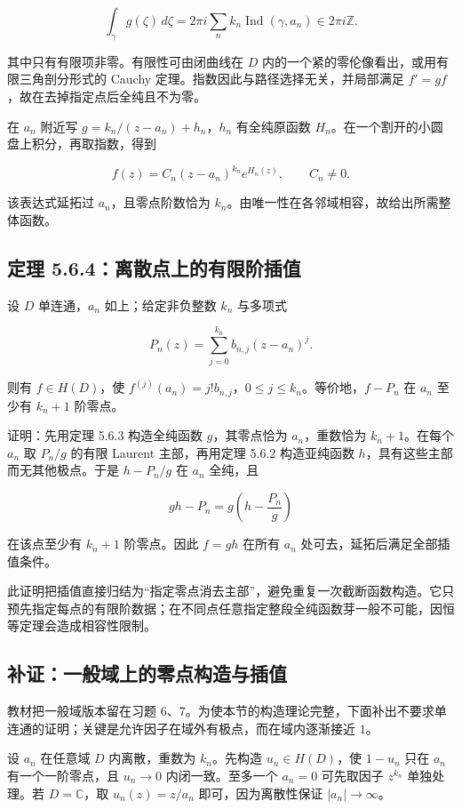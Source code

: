 \documentclass[11pt,a4paper]{article}
\begin{document}
\[
\int_\gamma g(\zeta)\,d\zeta=2\pi i\sum_n k_n\operatorname{Ind}(\gamma,a_n)\in2\pi i\mathbb Z.
\]

其中只有有限项非零。有限性可由闭曲线在 \(D\)
内的一个紧的零伦像看出，或用有限三角剖分形式的 Cauchy
定理。指数因此与路径选择无关，并局部满足
\(f'=gf\)，故在去掉指定点后全纯且不为零。

在 \(a_n\) 附近写 \(g=k_n/(z-a_n)+h_n\)，\(h_n\) 有全纯原函数
\(H_n\)。在一个割开的小圆盘上积分，再取指数，得到

\[
f(z)=C_n(z-a_n)^{k_n}e^{H_n(z)},\qquad C_n\ne0.
\]

该表达式延拓过 \(a_n\)，且零点阶数恰为
\(k_n\)。由唯一性在各邻域相容，故给出所需整体函数。

\subsection{定理 5.6.4：离散点上的有限阶插值}\label{ch05-s6-heading-4}

设 \(D\) 单连通，\(a_n\) 如上；给定非负整数 \(k_n\) 与多项式

\[
P_n(z)=\sum_{j=0}^{k_n}b_{n,j}(z-a_n)^j.
\]

则有 \(f\in H(D)\)，使
\(f^{(j)}(a_n)=j!b_{n,j}\)，\(0\le j\le k_n\)。等价地，\(f-P_n\) 在
\(a_n\) 至少有 \(k_n+1\) 阶零点。

证明：先用定理 5.6.3 构造全纯函数 \(g\)，其零点恰为 \(a_n\)，重数恰为
\(k_n+1\)。在每个 \(a_n\) 取 \(P_n/g\) 的有限 Laurent 主部，再用定理
5.6.2 构造亚纯函数 \(h\)，具有这些主部而无其他极点。于是 \(h-P_n/g\) 在
\(a_n\) 全纯，且

\[
gh-P_n=g\left(h-\frac{P_n}{g}\right)
\]

在该点至少有 \(k_n+1\) 阶零点。因此 \(f=gh\) 在所有 \(a_n\)
处可去，延拓后满足全部插值条件。

此证明把插值直接归结为``指定零点消去主部''，避免重复一次截断函数构造。它只预先指定每点的有限阶数据；在不同点任意指定整段全纯函数芽一般不可能，因恒等定理会造成相容性限制。

\subsection{补证：一般域上的零点构造与插值}\label{ch05-s6-heading-5}

教材把一般域版本留在习题
6、7。为使本节的构造理论完整，下面补出不要求单连通的证明；关键是允许因子在域外有极点，而在域内逐渐接近
\(1\)。

设 \(a_n\) 在任意域 \(D\) 内离散，重数为 \(k_n\)。先构造
\(u_n\in H(D)\)，使 \(1-u_n\) 只在 \(a_n\) 有一个一阶零点，且
\(u_n\to0\) 内闭一致。至多一个 \(a_n=0\) 可先取因子 \(z^{k_n}\)
单独处理。若 \(D=\mathbb C\)，取 \(u_n(z)=z/a_n\) 即可，因为离散性保证
\(|a_n|\to\infty\)。
\end{document}
